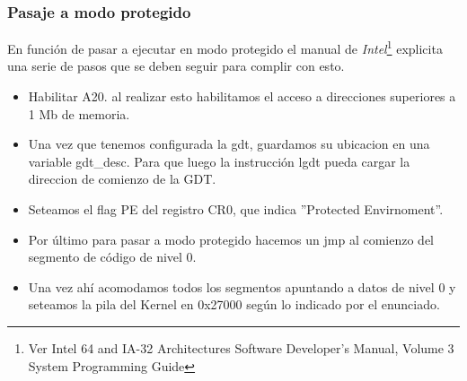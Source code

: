 \subsubsection{Pasaje a modo protegido}

En funci\'on de pasar a ejecutar en modo protegido el manual de \emph{Intel}\footnote{Ver Intel 64 and IA-32 Architectures Software 
Developer's Manual, Volume 3 System Programming Guide} explicita una serie de pasos que se deben seguir para complir con esto.\\
\begin{itemize}
 \item Habilitar A20. al realizar esto habilitamos el acceso a direcciones superiores a 1 Mb de memoria.
 \item Una vez que tenemos configurada la gdt, guardamos su ubicacion en una variable gdt\_desc. Para que luego la instrucci\'on lgdt 
pueda cargar la direccion de comienzo de la GDT.
 \item Seteamos el flag PE del registro CR0, que indica ''Protected Envirnoment''.
 \item Por \'ultimo para pasar a modo protegido hacemos un jmp al comienzo del segmento de c\'odigo de nivel 0.
 \item Una vez ah\'i acomodamos todos los segmentos apuntando a datos de nivel 0 y seteamos la pila del Kernel en 0x27000 seg\'un lo
indicado por el enunciado.
\end{itemize}
